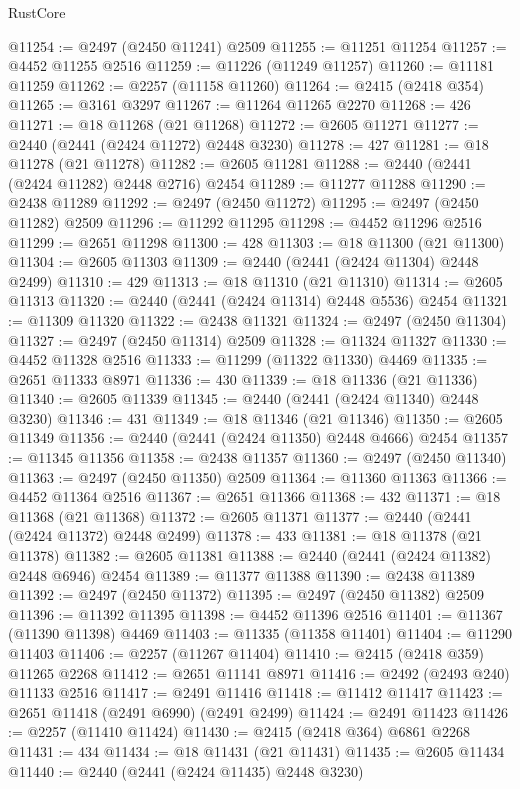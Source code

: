 \begin{lexlean}{RustCore}
\begin{coremodule}
@11254 := @2497 (@2450 @11241) @2509
@11255 := @11251 @11254
@11257 := @4452 @11255 @2516
@11259 := @11226 (@11249 @11257)
@11260 := @11181 @11259
@11262 := @2257 (@11158 @11260)
@11264 := @2415 (@2418 @354)
@11265 := @3161 @3297
@11267 := @11264 @11265 @2270
@11268 := 426
@11271 := @18 @11268 (@21 @11268)
@11272 := @2605 @11271
@11277 := @2440 (@2441 (@2424 @11272) @2448 @3230)
@11278 := 427
@11281 := @18 @11278 (@21 @11278)
@11282 := @2605 @11281
@11288 := @2440 (@2441 (@2424 @11282) @2448 @2716) @2454
@11289 := @11277 @11288
@11290 := @2438 @11289
@11292 := @2497 (@2450 @11272)
@11295 := @2497 (@2450 @11282) @2509
@11296 := @11292 @11295
@11298 := @4452 @11296 @2516
@11299 := @2651 @11298
@11300 := 428
@11303 := @18 @11300 (@21 @11300)
@11304 := @2605 @11303
@11309 := @2440 (@2441 (@2424 @11304) @2448 @2499)
@11310 := 429
@11313 := @18 @11310 (@21 @11310)
@11314 := @2605 @11313
@11320 := @2440 (@2441 (@2424 @11314) @2448 @5536) @2454
@11321 := @11309 @11320
@11322 := @2438 @11321
@11324 := @2497 (@2450 @11304)
@11327 := @2497 (@2450 @11314) @2509
@11328 := @11324 @11327
@11330 := @4452 @11328 @2516
@11333 := @11299 (@11322 @11330) @4469
@11335 := @2651 @11333 @8971
@11336 := 430
@11339 := @18 @11336 (@21 @11336)
@11340 := @2605 @11339
@11345 := @2440 (@2441 (@2424 @11340) @2448 @3230)
@11346 := 431
@11349 := @18 @11346 (@21 @11346)
@11350 := @2605 @11349
@11356 := @2440 (@2441 (@2424 @11350) @2448 @4666) @2454
@11357 := @11345 @11356
@11358 := @2438 @11357
@11360 := @2497 (@2450 @11340)
@11363 := @2497 (@2450 @11350) @2509
@11364 := @11360 @11363
@11366 := @4452 @11364 @2516
@11367 := @2651 @11366
@11368 := 432
@11371 := @18 @11368 (@21 @11368)
@11372 := @2605 @11371
@11377 := @2440 (@2441 (@2424 @11372) @2448 @2499)
@11378 := 433
@11381 := @18 @11378 (@21 @11378)
@11382 := @2605 @11381
@11388 := @2440 (@2441 (@2424 @11382) @2448 @6946) @2454
@11389 := @11377 @11388
@11390 := @2438 @11389
@11392 := @2497 (@2450 @11372)
@11395 := @2497 (@2450 @11382) @2509
@11396 := @11392 @11395
@11398 := @4452 @11396 @2516
@11401 := @11367 (@11390 @11398) @4469
@11403 := @11335 (@11358 @11401)
@11404 := @11290 @11403
@11406 := @2257 (@11267 @11404)
@11410 := @2415 (@2418 @359) @11265 @2268
@11412 := @2651 @11141 @8971
@11416 := @2492 (@2493 @240) @11133 @2516
@11417 := @2491 @11416
@11418 := @11412 @11417
@11423 := @2651 @11418 (@2491 @6990) (@2491 @2499)
@11424 := @2491 @11423
@11426 := @2257 (@11410 @11424)
@11430 := @2415 (@2418 @364) @6861 @2268
@11431 := 434
@11434 := @18 @11431 (@21 @11431)
@11435 := @2605 @11434
@11440 := @2440 (@2441 (@2424 @11435) @2448 @3230)

\end{coremodule}
\end{lexlean}
